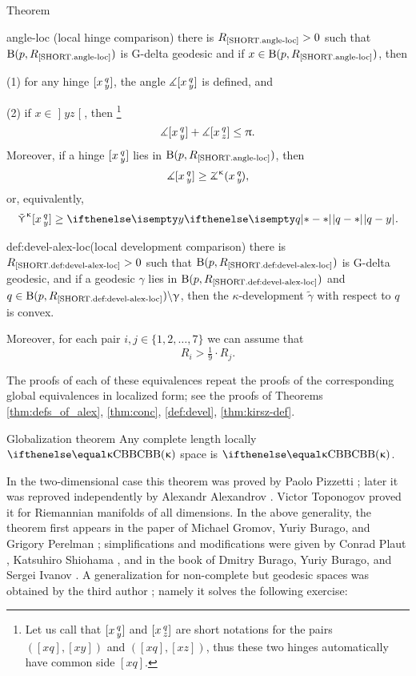 \begin{thm}{Theorem}
\begin{subthmN}{angle-loc} (local hinge comparison) 
there is $R_{\hbox{\rm\scriptsize\ref{SHORT.angle-loc}}}>0$ such that $\mathrm{B}{}(p,R_{\hbox{\rm\scriptsize\ref{SHORT.angle-loc}}})$ is G-delta geodesic and if $x\in \oBall(p,R_{\hbox{\rm\scriptsize\ref{SHORT.angle-loc}}})$, then 

(1) for any hinge $[x\,{}^{q}_{y}]$, the angle 
$\measuredangle[x\,{}^{q}_{y}]$ is defined, and

 (2) if $x\in \mathopen{]}y z\mathclose{[}$, then%
\footnote{Let us call that $[x\,{}^{q}_{y}]$ and $[x\,{}^{q}_{z}]$  are short notations for the pairs $([x q],[x y])$ and $([x q],[x z])$, 
thus these two hinges automatically have common side $[x q]$.}
\[\mangle\hinge x q y+ \mangle\hinge x q z\le\pi.\]
Moreover, if a hinge $[x\,{}^{q}_{y}]$ lies in $\mathrm{B}{}(p,R_{\hbox{\rm\scriptsize\ref{SHORT.angle-loc}}})$, then 
\[\mangle\hinge x q y
\ge\angk\kappa x q y,\]
or, equivalently,
\[\side\kappa \hinge x q y\ge\dist{q}{ y}{}.\]
\end{subthmN}


\begin{subthmN}{def:devel-alex-loc}(local development comparison) 
there is $R_{\hbox{\rm\scriptsize\ref{SHORT.def:devel-alex-loc}}}>0$ 
such that $\mathrm{B}{}(p,R_{\hbox{\rm\scriptsize\ref{SHORT.def:devel-alex-loc}}})$ 
is G-delta geodesic, and if a geodesic $\gamma$ lies in $\mathrm{B}{}(p,R_{\hbox{\rm\scriptsize\ref{SHORT.def:devel-alex-loc}}})$ and $q\in 
\oBall(p,R_{\hbox{\rm\scriptsize\ref{SHORT.def:devel-alex-loc}}})
\backslash \gamma$, then the $\kappa$-development $\tilde \gamma$ with respect to $q$ is convex.
\end{subthmN}
Moreover, for each pair $i,j\in \{1,2,\dots,7\}$ we can assume that 
\[R_i>\tfrac{1}{9}\cdot R_j.\]
\end{thm}

The proofs of each of these equivalences repeat the proofs of the corresponding global equivalences in localized form; see the proofs of Theorems \ref{thm:defs_of_alex}, \ref{thm:conc}, \ref{def:devel}, \ref{thm:kirsz-def}.


\begin{thm}{Globalization theorem}\label{thm:glob} 
Any complete length locally $\Alex\kappa$ space is $\Alex\kappa$.
\end{thm}

{\sloppy

In the two-dimensional case this theorem was proved by Paolo Pizzetti \cite{pizzetti};
later it was reproved independently by Alexandr Alexandrov \cite{alexandrov:devel}. %
Victor Toponogov \cite{toponogov-globalization+splitting} proved it for Riemannian manifolds of all dimensions.
In the above generality, the theorem first appears in the paper of Michael Gromov, Yuriy Burago, and Grigory Perelman \cite{burago-gromov-perelman}; 
simplifications and modifications were given by Conrad Plaut \cite{plaut:dimension}, Katsuhiro Shiohama \cite{shiohama}, and in the book of Dmitry Burago, Yuriy Burago, and Sergei Ivanov \cite{burago-burago-ivanov}.
A generalization for non-complete but geodesic spaces was obtained by the third author \cite{petrunin:globalization}; namely it solves the following exercise:

}

